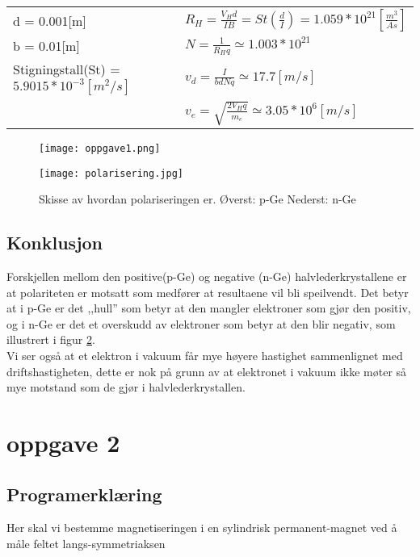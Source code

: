 \documentclass{article}
\begin{document}
\begin{center}
   \begin{tabular}{  l  l  }
   d = 0.001[m]  & $R_H = \frac{V_H d}{I B} = St\left(\frac{d}{I}\right) = 1.059*10^{21} \left[\frac{m^3}{As} \right]$ \\
   b = 0.01[m] & $N = \frac{1}{R_Hq} \simeq 1.003*10^{21}$\\
   Stigningstall(St) = $5.9015*10^{-3}[m^2/s]$ &$v_d = \frac{I}{bdNq} \simeq 17.7 [m/s]$\\
   &$v_e = \sqrt{\frac{2V_H q}{m_e}} \simeq 3.05*10^6[m/s]$
   \end{tabular}
\end{center}

\begin{figure}[h!]
\texttt{[image: oppgave1.png]} 
\caption{}
\label{1}
\end{figure}

\begin{figure}[h]
\texttt{[image: polarisering.jpg]} 
\caption{Skisse av hvordan polariseringen er.  Øverst: p-Ge Nederst: n-Ge}
\label{2}
\end{figure}

\newpage
\subsection{Konklusjon}
Forskjellen mellom den positive(p-Ge) og negative (n-Ge) halvlederkrystallene er at polariteten er motsatt som medfører at resultaene vil bli speilvendt.  Det betyr at i p-Ge er det ,,hull'' som betyr at den mangler elektroner som gjør den positiv, og i n-Ge er det et overskudd av elektroner som betyr at den blir negativ, som illustrert i figur \ref{2}. \\
Vi ser også at et elektron i vakuum får mye høyere hastighet sammenlignet med driftshastigheten, dette er nok på grunn av at elektronet i vakuum ikke møter så mye motstand som de gjør i halvlederkrystallen. 



\newpage
\section{oppgave 2}

\subsection{Programerklæring}
Her skal vi bestemme magnetiseringen i en sylindrisk permanent-magnet ved å måle feltet langs-symmetriaksen
\end{document}
